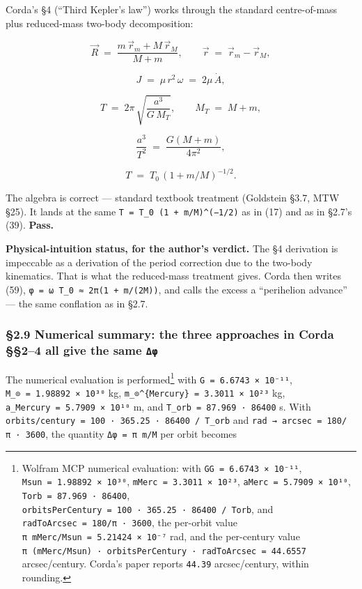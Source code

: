 \documentclass[
  11pt,
]{article}
\begin{document}
Corda's §4 (``Third Kepler's law'') works through the standard
centre-of-mass plus reduced-mass two-body decomposition:

\[
\vec R \;=\; \frac{m\,\vec r_{m} + M\,\vec r_{M}}{M + m},
\qquad
\vec r \;=\; \vec r_{m} - \vec r_{M}, \tag{43}
\]

\[
J \;=\; \mu\,r^{2}\,\omega \;=\; 2\mu\,\dot A, \tag{45}
\]

\[
T \;=\; 2\pi\,\sqrt{\frac{a^{3}}{G\,M_{T}}},
\qquad
M_{T} \;=\; M + m, \tag{53}
\]

\[
\frac{a^{3}}{T^{2}} \;=\; \frac{G(M+m)}{4\pi^{2}}, \tag{54}
\]

\[
T \;=\; T_{0}\,(1 + m/M)^{-1/2}. \tag{57}
\]

The algebra is correct --- standard textbook treatment (Goldstein §3.7,
MTW §25). It lands at the same
\texttt{T\ =\ T\_0\ (1\ +\ m/M)\^{}(−1/2)} as in (17) and as in §2.7's
(39). \textbf{Pass.}

\textbf{Physical-intuition status, for the author's verdict.} The §4
derivation is impeccable as a derivation of the period correction due to
the two-body kinematics. That is what the reduced-mass treatment gives.
Corda then writes (59), \texttt{φ\ =\ ω\ T\_0\ ≈\ 2π(1\ +\ m/(2M))}, and
calls the excess a ``perihelion advance'' --- the same conflation as in
§2.7.

\hypertarget{numerical-summary-the-three-approaches-in-corda-24-all-give-the-same-ux3b4ux3c6}{%
\subsubsection{\texorpdfstring{§2.9 Numerical summary: the three
approaches in Corda §§2--4 all give the same
\texttt{Δφ}}{§2.9 Numerical summary: the three approaches in Corda §§2--4 all give the same Δφ}}\label{numerical-summary-the-three-approaches-in-corda-24-all-give-the-same-ux3b4ux3c6}}

The numerical evaluation is performed\footnote{Wolfram MCP numerical
  evaluation: with \texttt{GG\ =\ 6.6743\ ×\ 10⁻¹¹},
  \texttt{Msun\ =\ 1.98892\ ×\ 10³⁰},
  \texttt{mMerc\ =\ 3.3011\ ×\ 10²³},
  \texttt{aMerc\ =\ 5.7909\ ×\ 10¹⁰},
  \texttt{Torb\ =\ 87.969\ ·\ 86400},
  \texttt{orbitsPerCentury\ =\ 100\ ·\ 365.25\ ·\ 86400\ /\ Torb}, and
  \texttt{radToArcsec\ =\ 180/π\ ·\ 3600}, the per-orbit value
  \texttt{π\ mMerc/Msun\ =\ 5.21424\ ×\ 10⁻⁷} rad, and the per-century
  value
  \texttt{π\ (mMerc/Msun)\ ·\ orbitsPerCentury\ ·\ radToArcsec\ =\ 44.6557}
  arcsec/century. Corda's paper reports \texttt{44.39} arcsec/century,
  within rounding.} with \texttt{G\ =\ 6.6743\ ×\ 10⁻¹¹},
\texttt{M\_⊙\ =\ 1.98892\ ×\ 10³⁰} kg,
\texttt{m\_⊙\^{}\{Mercury\}\ =\ 3.3011\ ×\ 10²³} kg,
\texttt{a\_Mercury\ =\ 5.7909\ ×\ 10¹⁰} m, and
\texttt{T\_orb\ =\ 87.969\ ·\ 86400} s. With
\texttt{orbits/century\ =\ 100\ ·\ 365.25\ ·\ 86400\ /\ T\_orb} and
\texttt{rad\ →\ arcsec\ =\ 180/π\ ·\ 3600}, the quantity
\texttt{Δφ\ =\ π\ m/M} per orbit becomes
\end{document}
